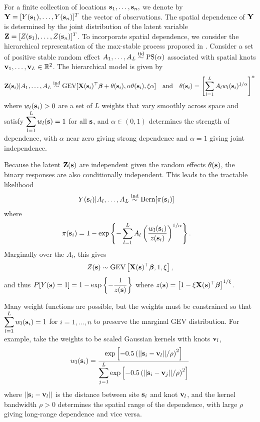 For a finite collection of locations $\mathbf{s}_1, \ldots, \mathbf{s}_n,$ we denote by $\mathbf{Y} = [Y(\mathbf{s}_1), \ldots, Y(\mathbf{s}_n)]^T$ the vector of observations.
The spatial dependence of $\mathbf{Y}$ is determined by the joint distribution of the latent variable $\mathbf{Z} = [Z(\mathbf{s}_1),\ldots, Z(\mathbf{s}_n)]^T$.
To incorporate spatial dependence, we consider the hierarchical representation of the max-stable process proposed in \citet{Reich2012}.
Consider a set of positive stable random effect $A_1, \ldots, A_L \stackrel{\mathrm{iid}}{\sim} \text{PS}(\alpha)$ associated with spatial knots $\mathbf{v}_1, \ldots, \mathbf{v}_L \in \mathbb{R}^2$.
The hierarchical model is given by
\begin{align} \label{rbeq:hiermodel}
  \mathbf{Z}(\mathbf{s}_i) | A_1, \ldots, A_L \stackrel{\mathrm{ind}}{\sim} \text{GEV}[\mathbf{X}(\mathbf{s}_i)^\top \mbox{\boldmath $\beta$} + \theta(\mathbf{s}_i), \alpha \theta(\mathbf{s}_i), \xi \alpha] \quad \text{and} \quad \theta(\mathbf{s}_i) = \left[\sum_{l = 1}^L A_l w_l (\mathbf{s}_i)^{1 / \alpha} \right]^\alpha
\end{align}
where $w_{l}(\mathbf{s}_i) > 0$ are a set of $L$ weights that vary smoothly across space and satisfy $\displaystyle \sum_{l = 1}^L w_l(\mathbf{s}) = 1$ for all $\mathbf{s}$, and $\alpha\in(0,1)$ determines the strength of dependence, with $\alpha$ near zero giving strong dependence and $\alpha=1$ giving joint independence.

Because the latent $\mathbf{Z}(\mathbf{s})$ are independent given the random effects $\theta(\mathbf{s})$, the binary responses are also conditionally independent.
This leads to the tractable likelihood
\begin{align} \label{rbeq:condlike}
  Y(\mathbf{s}_i) | A_l, \ldots, A_L &\stackrel{\mathrm{ind}}{\sim} \text{Bern}[\pi(\mathbf{s}_i)]
\end{align}
where
\begin{align} \label{rbeq:pyeq1cond}
  \pi(\mathbf{s}_i) &= 1 - \exp \left\{ -\displaystyle \sum_{ l = 1 }^{L} A_l \left( \frac{ w_{l}(\mathbf{s}_i) }{ z(\mathbf{s}_i) } \right)^{ 1/\alpha} \right\}.
\end{align}
Marginally over the $A_l$, this gives
\begin{align}
  Z(\mathbf{s}) \sim \text{GEV}\left[\mathbf{X}(\mathbf{s})^\top \mbox{\boldmath $\beta$}, 1, \xi\right],
\end{align}
and thus $P[Y(\mathbf{s}) = 1] = 1 - \exp\left\{-\displaystyle \frac{1}{z(\mathbf{s})}\right\}$ where $z(\mathbf{s}) = \left[1 - \xi \mathbf{X}(\mathbf{s})^\top \mbox{\boldmath $\beta$}\right]^{1 / \xi}$.

Many weight functions are possible, but the weights must be constrained so that $\displaystyle \sum_{l=1}^L w_{l}(\mathbf{s}_i)=1$ for $i=1,\ldots,n$ to preserve the marginal GEV distribution.
For example, \cite{Reich2012} take the weights to be scaled Gaussian kernels with knots $\mathbf{v}_l$,
\begin{align}\label{rbeq:w}
   w_{l}(\mathbf{s}_i) = \frac{\exp\left[-0.5\left(||\mathbf{s}_i-\mathbf{v}_l||/\rho\right)^2\right]}
                 {\displaystyle \sum_{j=1}^L\exp\left[-0.5\left(||\mathbf{s}_i-\mathbf{v}_j||/\rho\right)^2\right]}
\end{align}
where $||\mathbf{s}_i - \mathbf{v}_l||$ is the distance between site $\mathbf{s}_i$ and knot $\mathbf{v}_l$, and the kernel bandwidth $\rho>0$ determines the spatial range of the dependence, with large $\rho$ giving long-range dependence and vice versa.

